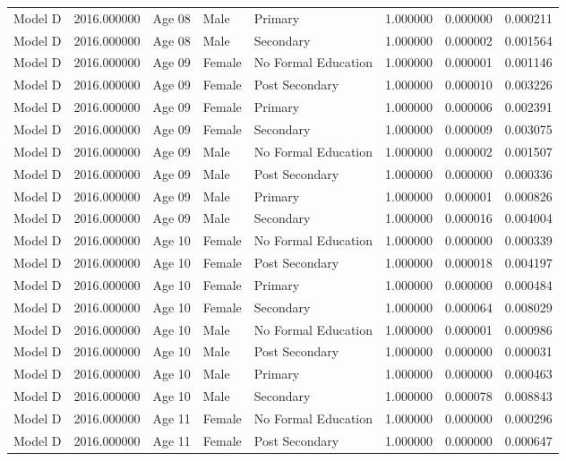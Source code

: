 \begin{table}[ht]
\begin{tabular}{lrlllrrr}
Model D & 2016.000000 & Age 08 & Male & Primary & 1.000000 & 0.000000 & 0.000211 \\
Model D & 2016.000000 & Age 08 & Male & Secondary & 1.000000 & 0.000002 & 0.001564 \\
Model D & 2016.000000 & Age 09 & Female & No Formal Education & 1.000000 & 0.000001 & 0.001146 \\
Model D & 2016.000000 & Age 09 & Female & Post Secondary & 1.000000 & 0.000010 & 0.003226 \\
Model D & 2016.000000 & Age 09 & Female & Primary & 1.000000 & 0.000006 & 0.002391 \\
Model D & 2016.000000 & Age 09 & Female & Secondary & 1.000000 & 0.000009 & 0.003075 \\
Model D & 2016.000000 & Age 09 & Male & No Formal Education & 1.000000 & 0.000002 & 0.001507 \\
Model D & 2016.000000 & Age 09 & Male & Post Secondary & 1.000000 & 0.000000 & 0.000336 \\
Model D & 2016.000000 & Age 09 & Male & Primary & 1.000000 & 0.000001 & 0.000826 \\
Model D & 2016.000000 & Age 09 & Male & Secondary & 1.000000 & 0.000016 & 0.004004 \\
Model D & 2016.000000 & Age 10 & Female & No Formal Education & 1.000000 & 0.000000 & 0.000339 \\
Model D & 2016.000000 & Age 10 & Female & Post Secondary & 1.000000 & 0.000018 & 0.004197 \\
Model D & 2016.000000 & Age 10 & Female & Primary & 1.000000 & 0.000000 & 0.000484 \\
Model D & 2016.000000 & Age 10 & Female & Secondary & 1.000000 & 0.000064 & 0.008029 \\
Model D & 2016.000000 & Age 10 & Male & No Formal Education & 1.000000 & 0.000001 & 0.000986 \\
Model D & 2016.000000 & Age 10 & Male & Post Secondary & 1.000000 & 0.000000 & 0.000031 \\
Model D & 2016.000000 & Age 10 & Male & Primary & 1.000000 & 0.000000 & 0.000463 \\
Model D & 2016.000000 & Age 10 & Male & Secondary & 1.000000 & 0.000078 & 0.008843 \\
Model D & 2016.000000 & Age 11 & Female & No Formal Education & 1.000000 & 0.000000 & 0.000296 \\
Model D & 2016.000000 & Age 11 & Female & Post Secondary & 1.000000 & 0.000000 & 0.000647 \\

\end{tabular}
\end{table}
